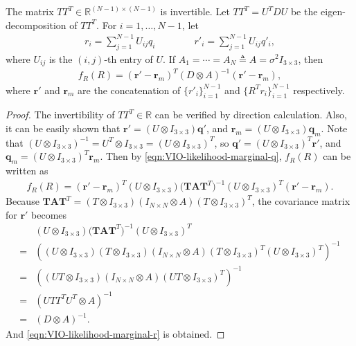 \begin{theorem}
	The matrix $TT^T \in \mathbb{R}^{(N-1)\times (N-1)}$ is invertible.
	Let $TT^T = U^TDU$ be the eigen-decomposition of $TT^T$.
	For $i = 1,\ldots,N-1$, let
	\begin{align} \label{eqn:VIO-uncorrelate}
		r_i = \sum_{j=1}^{N-1} U_{ij} q_i \qquad\qquad r'_i = \sum_{j=1}^{N-1} U_{ij} q'_i,
	\end{align}
	where $U_{ij}$ is the $(i,j)$-th entry of $U$.
	If $A_1 = \cdots = A_N \triangleq A = \sigma^2I_{3\times 3}$, then
	\begin{align} \label{eqn:VIO-likelihood-marginal-r}
		f_R(R) = (\bm{r}'-\bm{r}_m)^T (D\otimes A)^{-1} (\bm{r}'-\bm{r}_m),
	\end{align}
	where $\bm{r}'$ and $\bm{r}_m$ are the concatenation of $\{r'_i\}_{i=1}^{N-1}$ and $\{R^T r_i\}_{i=1}^{N-1}$ respectively.
\end{theorem}
\begin{proof}
	The invertibility of $TT^T \in \mathbb{R}$ can be verified by direction calculation.
	Also, it can be easily shown that $\bm{r}' = (U\otimes I_{3\times 3}) \bm{q}'$, and $\bm{r}_m = (U\otimes I_{3\times 3})\bm{q}_m$.
	Note that $(U\otimes I_{3\times 3})^{-1} = U^T\otimes I_{3\times 3} = (U\otimes I_{3\times 3})^T$, so $\bm{q}' = (U\otimes I_{3\times 3})^T \bm{r}'$, and $\bm{q}_m = (U\otimes I_{3\times 3})^T \bm{r}_m$.
	Then by \eqref{eqn:VIO-likelihood-marginal-q}, $f_R(R)$ can be written as
	\begin{align*}
		f_R(R) = (\bm{r}'-\bm{r}_m)^T (U\otimes I_{3\times 3}) \big(\mathbf{T}\mathbf{A}\mathbf{T}^T\big)^{-1} (U\otimes I_{3\times 3})^T (\bm{r}'-\bm{r}_m).
	\end{align*}
	Because $\mathbf{T}\mathbf{A}\mathbf{T}^T = (T\otimes I_{3\times 3})(I_{N\times N}\otimes A)(T\otimes I_{3\times 3})^T$, the covariance matrix for $\bm{r}'$ becomes
	\begin{align*}
		&(U\otimes I_{3\times 3}) \big(\mathbf{T}\mathbf{A}\mathbf{T}^T\big)^{-1} (U\otimes I_{3\times 3})^T \\
		= &\left( (U\otimes I_{3\times 3}) (T\otimes I_{3\times 3}) (I_{N\times N}\otimes A) (T\otimes I_{3\times 3})^T (U\otimes I_{3\times 3})^T \right)^{-1} \\
		= &\left( (UT\otimes I_{3\times 3}) (I_{N\times N}\otimes A) (UT\otimes I_{3\times 3})^T \right)^{-1} \\
		= &(UTT^TU^T \otimes A)^{-1} \\
		= &(D\otimes A)^{-1}.
	\end{align*}
	And \eqref{eqn:VIO-likelihood-marginal-r} is obtained.
\end{proof}

